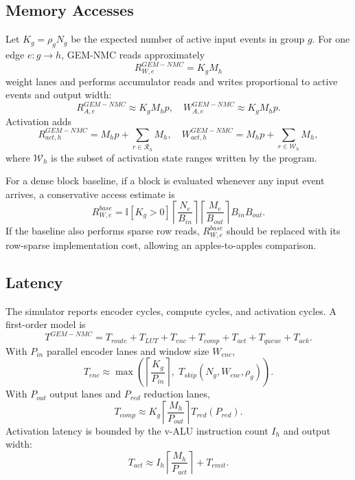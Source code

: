\documentclass[10pt,conference]{IEEEtran}
\newcommand{\arch}{GEM-NMC}
\begin{document}
\subsection{Memory Accesses}
Let $K_g=\rho_gN_g$ be the expected number of active input events in group $g$. For one edge $e:g\rightarrow h$, \arch{} reads approximately
\begin{equation}
    R_{W,e}^{\arch}=K_gM_h
\end{equation}
weight lanes and performs accumulator reads and writes proportional to active events and output width:
\begin{equation}
    R_{A,e}^{\arch}\approx K_gM_hp, \quad W_{A,e}^{\arch}\approx K_gM_hp.
\end{equation}
Activation adds
\begin{equation}
    R_{act,h}^{\arch}=M_hp + \sum_{r\in\mathcal{R}_h}M_h, \quad W_{act,h}^{\arch}=M_hp + \sum_{r\in\mathcal{W}_h}M_h,
\end{equation}
where $\mathcal{W}_h$ is the subset of activation state ranges written by the program.

For a dense block baseline, if a block is evaluated whenever any input event arrives, a conservative access estimate is
\begin{equation}
    R_{W,e}^{base}=\mathbb{I}[K_g>0]\left\lceil\frac{N_e}{B_{in}}\right\rceil\left\lceil\frac{M_e}{B_{out}}\right\rceil B_{in}B_{out}.
\end{equation}
If the baseline also performs sparse row reads, $R_{W,e}^{base}$ should be replaced with its row-sparse implementation cost, allowing an apples-to-apples comparison.

\subsection{Latency}
The simulator reports encoder cycles, compute cycles, and activation cycles. A first-order model is
\begin{equation}
    T^{\arch}=T_{route}+T_{LUT}+T_{enc}+T_{comp}+T_{act}+T_{queue}+T_{ack}.
\end{equation}
With $P_{in}$ parallel encoder lanes and window size $W_{enc}$,
\begin{equation}
    T_{enc}\approx \max\left(\left\lceil\frac{K_g}{P_{in}}\right\rceil,\; T_{skip}(N_g,W_{enc},\rho_g)\right).
\end{equation}
With $P_{out}$ output lanes and $P_{red}$ reduction lanes,
\begin{equation}
    T_{comp}\approx K_g\left\lceil\frac{M_h}{P_{out}}\right\rceil T_{red}(P_{red}).
\end{equation}
Activation latency is bounded by the v-ALU instruction count $I_h$ and output width:
\begin{equation}
    T_{act}\approx I_h\left\lceil\frac{M_h}{P_{act}}\right\rceil + T_{emit}.
\end{equation}
\end{document}

